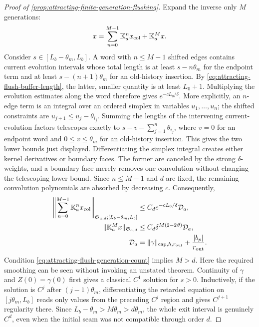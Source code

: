 \begin{proof}[Proof of
\cref{prop:attracting-finite-generation-flushing}]
Expand the inverse only \(M\) generations:
\begin{equation}
 x=\sum_{n=0}^{M-1}\mathbb K_a^nx_{\rm col}
                  +\mathbb K_a^Mx.                \label{eq:attracting-finite-generation-expansion}
\end{equation}
Consider \(s\in[L_b-\theta_m,L_b]\).  A word with \(n\le M-1\) shifted
edges contains current evolution intervals whose total length is at least
\(s-n\theta_m\) for the endpoint term and at least
\(s-(n+1)\theta_m\) for an old-history insertion.  By
\cref{eq:attracting-flush-buffer-length}, the latter, smaller quantity is
at least \(L_0+1\).  Multiplying the evolution estimates along the word
therefore gives \(e^{-cL_0/\delta}\).  More explicitly, an \(n\)-edge term
is an integral over an ordered simplex in variables \(u_1,\ldots,u_n\);
the shifted constraints are
\(u_{j+1}\le u_j-\theta_{i_j}\).  Summing the lengths of the intervening
current-evolution factors telescopes exactly to
\(s-v-\sum_{j=1}^n\theta_{i_j}\), where \(v=0\) for an endpoint word and
\(0\le v\le\theta_m\) for an old-history insertion.  This gives the two
lower bounds just displayed.
Differentiating the simplex integral creates either kernel derivatives or
boundary faces.  The former are canceled by the strong \(\delta\)-weights,
and a boundary face merely removes one convolution without changing the
telescoping lower bound.  Since \(n\le M-1\) and \(d\) are fixed, the
remaining convolution polynomials are absorbed by decreasing \(c\).
Consequently,
\begin{align}
 \left\|\sum_{n=0}^{M-1}\mathbb K_a^nx_{\rm col}
       \right\|_{\mathfrak S_{a,d};
             [L_b-\theta_m,L_b]}
 &\le C_de^{-cL_0/\delta}\mathcal D_a,\notag\\
 \|\mathbb K_a^Mx\|_{\mathfrak S_{a,d}}
 &\le C_d\delta^{M(2-2\vartheta)}\mathcal D_a,     \label{eq:attracting-word-tail-bounds}\\
 \mathcal D_a
 &=\|\gamma\|_{\mathrm{cap},h,r_{\rm out}}
                 +\frac{|b_p|}{r_{\rm out}}.\notag
\end{align}
Condition \cref{eq:attracting-flush-generation-count} implies \(M>d\).
Here the required smoothing can be seen without invoking an unstated
theorem.  Continuity of \(\gamma\) and \(Z(0)=\gamma(0)\) first gives a
classical \(C^1\) solution for \(s>0\).  Inductively, if the solution is
\(C^j\) after \((j-1)\theta_m\), differentiating the retarded equation on
\([j\theta_m,L_b]\) reads only values from the preceding \(C^j\) region and
gives \(C^{j+1}\) regularity there.  Since
\(L_b-\theta_m>M\theta_m>d\theta_m\), the whole exit interval is genuinely
\(C^d\), even when the initial seam was not compatible through order \(d\).


\end{proof}
